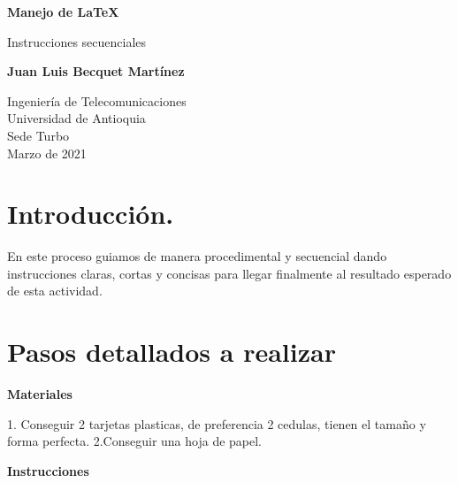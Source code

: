 \documentclass{article}
\begin{document}
\begin{titlepage}
    \begin{center}
        \vspace*{1cm}
            
        \Huge
        \textbf{Manejo de LaTeX}
            
        \vspace{0.5cm}
        \LARGE
        Instrucciones secuenciales
            
        \vspace{2.5cm}
            
        \textbf{Juan Luis Becquet Martínez}
            
        \vfill
            
        \vspace{0.8cm}
            
        \Large
        Ingeniería de Telecomunicaciones\\
        Universidad de Antioquia\\
        Sede Turbo\\
        Marzo de 2021
            
    \end{center}
\end{titlepage}

\tableofcontents
\newpage
\section{Introducción.}\label{intro}
En este proceso guiamos de manera procedimental y secuencial dando instrucciones claras, cortas y concisas para llegar finalmente al resultado esperado de esta actividad.

\section{Pasos detallados a realizar} \label{contenido}
        \textbf{Materiales}
        \vspace{0.4cm}
        
1. Conseguir 2 tarjetas plasticas, de preferencia 2 cedulas, tienen el tamaño y forma perfecta.
2.Conseguir una hoja de papel.

        \vspace{0.4cm}
        \textbf{Instrucciones}
\end{document}
